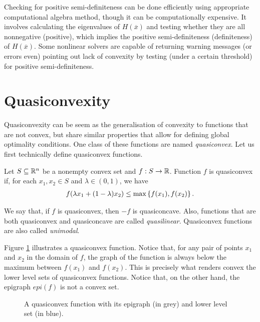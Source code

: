Checking for positive semi-definiteness can be done efficiently using appropriate computational algebra method, though it can be computationally expensive. It involves calculating the eigenvalues of $H(\overline{x})$ and testing whether they are all nonnegative (positive), which implies the positive semi-definiteness (definiteness) of $H(\overline{x})$. Some nonlinear solvers are capable of returning warning messages (or errors even) pointing out lack of convexity by testing (under a certain threshold) for positive semi-definiteness.


\section{Quasiconvexity}

Quasiconvexity can be seem as the generalisation of convexity to functions that are not convex, but share similar properties that allow for defining global optimality conditions. One class of these functions are named \emph{quasiconvex}. Let us first technically define quasiconvex functions.
%
\begin{definition}
	Let $S \subseteq \mathbb{R}^n$ be a nonempty convex set and $f:S \to \mathbb{R}$. Function $f$ is quasiconvex if, for each $x_1 ,x_2 \in S$ and $\lambda \in (0,1)$, we have
	\begin{align}
		f(\lambda x_1 + (1 - \lambda)x_2 ) \leq \max\left\{ f(x_1), f(x_2) \right \}. \label{eq:quasiconvexity}
	\end{align}
\end{definition}

We say that, if $f$ is quasiconvex, then $-f$ is quasiconcave. Also, functions that are both quasiconvex and quasiconcave are called \emph{quasilinear}. Quasiconvex functions are also called \emph{unimodal}.

Figure \ref{fig:quasiconvex} illustrates a quasiconvex function. Notice that, for any pair of points $x_1$ and $x_2$ in the domain of $f$, the graph of the function is always below the maximum between $f(x_1)$ and $f(x_2)$. This is precisely what renders convex the lower level sets of quasiconvex functions. Notice that, on the other hand, the epigraph $epi(f)$ is not a convex set. 

\begin{figure}[H]
		\caption{A quasiconvex function with its epigraph (in grey) and lower level set (in blue).} \label{fig:quasiconvex}
	\end{figure}



